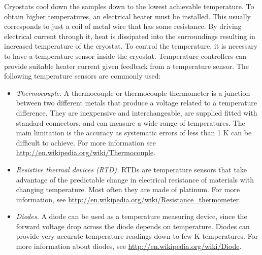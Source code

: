 \documentclass[byrevtex,amssymb,aps,pra,floatfix,letterpaper]{revtex4}
\begin{document}
Cryostats cool down the samples down to the lowest achievable temperature. To obtain higher temperatures, an electrical heater must be installed. This usually corresponds to just a coil of metal wire that has some resistance. By driving electrical current through it, heat is dissipated into the surroundings resulting in increased temperature of the cryostat. To control the temperature, it is necessary to have a temperature sensor inside the cryostat. Temperature controllers can provide suitable heater current given feedback from a temperature sensor. The following temperature sensors are commonly used:

\begin{itemize}
 \item \textit{Thermocouple.} A thermocouple or thermocouple thermometer is a junction between two different metals that produce a voltage related to a temperature difference. They are inexpensive and interchangeable, are supplied fitted with standard connectors, and can measure a wide range of temperatures. The main limitation is the accuracy as systematic errors of less than 1 K can be difficult to achieve. For more information see \url{http://en.wikipedia.org/wiki/Thermocouple}.
 \item \textit{Resistive thermal devices (RTD).} RTDs are temperature sensors that take advantage of the predictable change in electrical resistance of materials with changing temperature. Most often they are made of platinum. For more information, see \url{http://en.wikipedia.org/wiki/Resistance_thermometer}.
 \item \textit{Diodes.} A diode can be used as a temperature measuring device, since the forward voltage drop across the diode depends on temperature. Diodes can provide very accurate temperature readings down to few K temperatures. For more information about diodes, see \url{http://en.wikipedia.org/wiki/Diode}.
\end{itemize}



\end{document}
